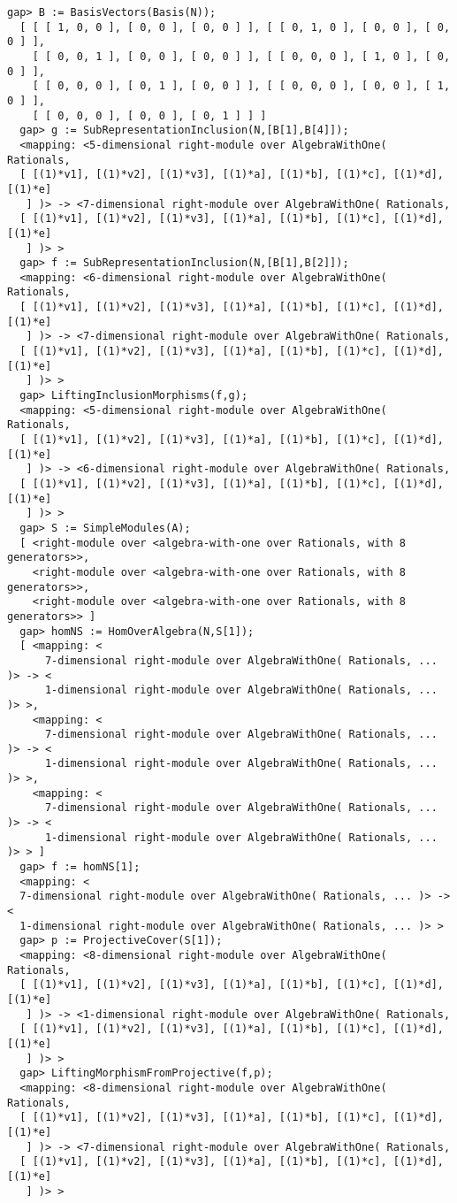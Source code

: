 \documentclass[a4paper,11pt]{report}
\begin{document}
{{ 
\begin{Verbatim}[fontsize=\small,frame=single,label=Example]
  gap> B := BasisVectors(Basis(N));
  [ [ [ 1, 0, 0 ], [ 0, 0 ], [ 0, 0 ] ], [ [ 0, 1, 0 ], [ 0, 0 ], [ 0, 0 ] ], 
    [ [ 0, 0, 1 ], [ 0, 0 ], [ 0, 0 ] ], [ [ 0, 0, 0 ], [ 1, 0 ], [ 0, 0 ] ], 
    [ [ 0, 0, 0 ], [ 0, 1 ], [ 0, 0 ] ], [ [ 0, 0, 0 ], [ 0, 0 ], [ 1, 0 ] ], 
    [ [ 0, 0, 0 ], [ 0, 0 ], [ 0, 1 ] ] ]
  gap> g := SubRepresentationInclusion(N,[B[1],B[4]]);
  <mapping: <5-dimensional right-module over AlgebraWithOne( Rationals, 
  [ [(1)*v1], [(1)*v2], [(1)*v3], [(1)*a], [(1)*b], [(1)*c], [(1)*d], [(1)*e] 
   ] )> -> <7-dimensional right-module over AlgebraWithOne( Rationals, 
  [ [(1)*v1], [(1)*v2], [(1)*v3], [(1)*a], [(1)*b], [(1)*c], [(1)*d], [(1)*e] 
   ] )> >
  gap> f := SubRepresentationInclusion(N,[B[1],B[2]]);
  <mapping: <6-dimensional right-module over AlgebraWithOne( Rationals, 
  [ [(1)*v1], [(1)*v2], [(1)*v3], [(1)*a], [(1)*b], [(1)*c], [(1)*d], [(1)*e] 
   ] )> -> <7-dimensional right-module over AlgebraWithOne( Rationals, 
  [ [(1)*v1], [(1)*v2], [(1)*v3], [(1)*a], [(1)*b], [(1)*c], [(1)*d], [(1)*e] 
   ] )> >
  gap> LiftingInclusionMorphisms(f,g);
  <mapping: <5-dimensional right-module over AlgebraWithOne( Rationals, 
  [ [(1)*v1], [(1)*v2], [(1)*v3], [(1)*a], [(1)*b], [(1)*c], [(1)*d], [(1)*e] 
   ] )> -> <6-dimensional right-module over AlgebraWithOne( Rationals, 
  [ [(1)*v1], [(1)*v2], [(1)*v3], [(1)*a], [(1)*b], [(1)*c], [(1)*d], [(1)*e] 
   ] )> >
  gap> S := SimpleModules(A); 
  [ <right-module over <algebra-with-one over Rationals, with 8 generators>>, 
    <right-module over <algebra-with-one over Rationals, with 8 generators>>, 
    <right-module over <algebra-with-one over Rationals, with 8 generators>> ]
  gap> homNS := HomOverAlgebra(N,S[1]);
  [ <mapping: <
      7-dimensional right-module over AlgebraWithOne( Rationals, ... )> -> <
      1-dimensional right-module over AlgebraWithOne( Rationals, ... )> >, 
    <mapping: <
      7-dimensional right-module over AlgebraWithOne( Rationals, ... )> -> <
      1-dimensional right-module over AlgebraWithOne( Rationals, ... )> >, 
    <mapping: <
      7-dimensional right-module over AlgebraWithOne( Rationals, ... )> -> <
      1-dimensional right-module over AlgebraWithOne( Rationals, ... )> > ]
  gap> f := homNS[1];
  <mapping: <
  7-dimensional right-module over AlgebraWithOne( Rationals, ... )> -> <
  1-dimensional right-module over AlgebraWithOne( Rationals, ... )> >
  gap> p := ProjectiveCover(S[1]);
  <mapping: <8-dimensional right-module over AlgebraWithOne( Rationals, 
  [ [(1)*v1], [(1)*v2], [(1)*v3], [(1)*a], [(1)*b], [(1)*c], [(1)*d], [(1)*e] 
   ] )> -> <1-dimensional right-module over AlgebraWithOne( Rationals, 
  [ [(1)*v1], [(1)*v2], [(1)*v3], [(1)*a], [(1)*b], [(1)*c], [(1)*d], [(1)*e] 
   ] )> >
  gap> LiftingMorphismFromProjective(f,p);
  <mapping: <8-dimensional right-module over AlgebraWithOne( Rationals, 
  [ [(1)*v1], [(1)*v2], [(1)*v3], [(1)*a], [(1)*b], [(1)*c], [(1)*d], [(1)*e] 
   ] )> -> <7-dimensional right-module over AlgebraWithOne( Rationals, 
  [ [(1)*v1], [(1)*v2], [(1)*v3], [(1)*a], [(1)*b], [(1)*c], [(1)*d], [(1)*e] 
   ] )> >
\end{Verbatim}
 

}}
\end{document}
